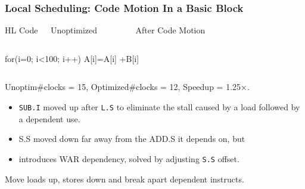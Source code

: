 \documentclass[rgb,dvipsnames]{beamer}
\renewcommand{\emph}[1]{\textcolor{structure}{#1}}
\newcommand{\emp}[1]{\textcolor{DikuRed}{ #1}}
\newcommand{\emphh}[1]{\textcolor{CosGreen}{ #1}}
\begin{document}
\begin{frame}[fragile,t]
    \frametitle{Local Scheduling: Code Motion In a Basic Block}

\begin{block}{HL Code{\tt~~~}Unoptimized{\tt~~~~~~~~~}After Code Motion}
\begin{columns}
\begin{colorcode}[fontsize=\scriptsize]
for(i=0;
    i<100;
    i++)
  A[i]=A[i]
      +B[i]
\end{colorcode} 
\end{columns}
\end{block}

\emph{Unoptim\#clocks = 15, Optimized\#clocks = 12, Speedup = 1.25$\times$.}\medskip
\pause

\begin{itemize}
    \item {\tt SUB.I} \emp{moved up} after {\tt L.S} to eliminate the stall
            caused by a load followed by a dependent use. 
    \item {S.S} \emp{moved down} far away from the {ADD.S} it depends on, but
    \item introduces {\sc WAR} dependency, solved by adjusting {\tt S.S} 
            offset. 
\end  {itemize}

Move loads up, stores down and break apart dependent instructs.

\end{frame}
\end{document}
